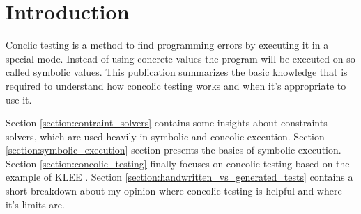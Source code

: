 \section{Introduction}
Conclic testing is a method to find programming errors by executing it in a special mode.
Instead of using concrete values the program will be executed on so called symbolic values.
This publication summarizes the basic knowledge that is required to understand how concolic testing works and when it's appropriate to use it.

Section \ref{section:contraint_solvers} contains some insights about constraints solvers, which are used heavily in symbolic and concolic execution.
Section \ref{section:symbolic_execution} section presents the basics of symbolic execution.
Section \ref{section:concolic_testing} finally focuses on concolic testing based on the example of KLEE \cite{Cadar:2008:KUA:1855741.1855756}. 
Section \ref{section:handwritten_vs_generated_tests} contains a short breakdown about my opinion where concolic testing is helpful and where it's limits are.
